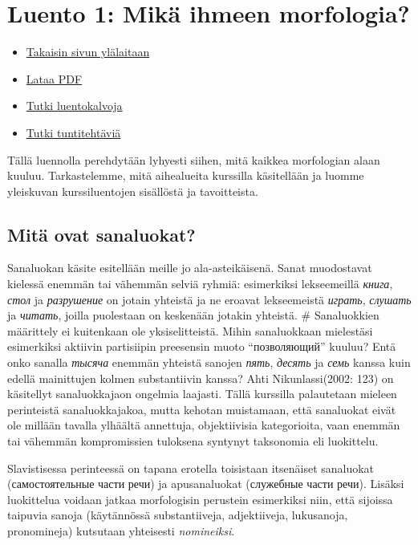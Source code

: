 \documentclass[]{scrartcl}
\providecommand{\tightlist}{%
  \setlength{\itemsep}{0pt}\setlength{\parskip}{0pt}}
\begin{document}
\section{Luento 1: Mikä ihmeen
morfologia?}\label{luento-1-mikuxe4-ihmeen-morfologia}

\begin{itemize}
\tightlist
\item
  \href{https://mustikka.uta.fi/~juho_harme/morfologia/\#tästä-kurssista}{Takaisin
  sivun ylälaitaan}
\item
  \href{http://mustikka.uta.fi/~juho_harme/morfologia/materiaalit/luento1.pdf}{Lataa
  PDF}
\item
  \href{http://mustikka.uta.fi/~juho_harme/morfologia/presentations/luento1.html}{Tutki
  luentokalvoja}
\item
  \href{http://mustikka.uta.fi/~juho_harme/morfologia/tehtavat/luento1.pdf}{Tutki
  tuntitehtäviä}
\end{itemize}

Tällä luennolla perehdytään lyhyesti siihen, mitä kaikkea morfologian
alaan kuuluu. Tarkastelemme, mitä aihealueita kurssilla käsitellään ja
luomme yleiskuvan kurssiluentojen sisällöstä ja tavoitteista.

\subsection{Mitä ovat sanaluokat?}\label{mituxe4-ovat-sanaluokat}

Sanaluokan käsite esitellään meille jo ala-asteikäisenä. Sanat
muodostavat kielessä enemmän tai vähemmän selviä ryhmiä: esimerkiksi
lekseemeillä \emph{книга}, \emph{стол} ja \emph{разрушение} on jotain
yhteistä ja ne eroavat lekseemeistä \emph{играть}, \emph{слушать} ja
\emph{читать}, joilla puolestaan on keskenään jotakin yhteistä. \#
Sanaluokkien määrittely ei kuitenkaan ole yksiselitteistä. Mihin
sanaluokkaan mielestäsi esimerkiksi aktiivin partisiipin preesensin
muoto ``позволяющий'' kuuluu? Entä onko sanalla \emph{тысяча} enemmän
yhteistä sanojen \emph{пять}, \emph{десять} ja \emph{семь} kanssa kuin
edellä mainittujen kolmen substantiivin kanssa? Ahti Nikunlassi(2002:
123) on käsitellyt sanaluokkajaon ongelmia laajasti. Tällä kurssilla
palautetaan mieleen perinteistä sanaluokkajakoa, mutta kehotan
muistamaan, että sanaluokat eivät ole millään tavalla ylhäältä
annettuja, objektiivisia kategorioita, vaan enemmän tai vähemmän
kompromissien tuloksena syntynyt taksonomia eli luokittelu.

Slavistisessa perinteessä on tapana erotella toisistaan itsenäiset
sanaluokat (самостоятельные части речи) ja apusanaluokat (служебные
части речи). Lisäksi luokittelua voidaan jatkaa morfologisin perustein
esimerkiksi niin, että sijoissa taipuvia sanoja (käytännössä
substantiiveja, adjektiiveja, lukusanoja, pronomineja) kutsutaan
yhteisesti \emph{nomineiksi}.
\end{document}
